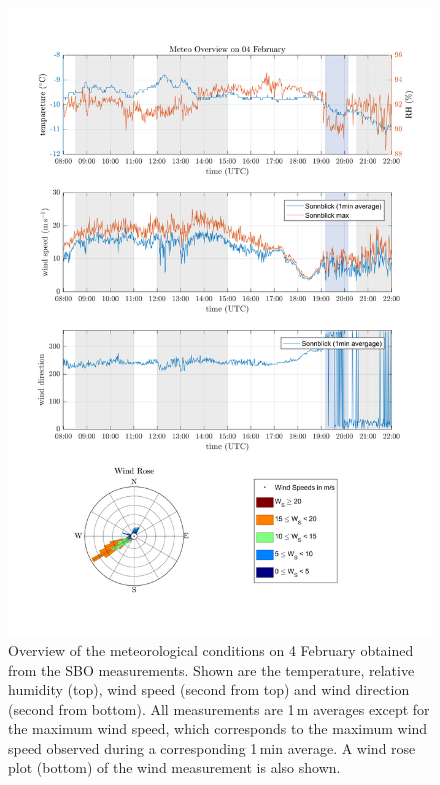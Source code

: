 \documentclass[draft,linenumbers]{agujournal}
\begin{document}
\begin{figure}[h]
 \centering
 	\includegraphics[width=14cm]{MeteoOvervire_0402.png}
 \caption{Overview of the meteorological conditions on 4 February obtained from the SBO measurements. Shown are the temperature, relative humidity (top), wind speed (second from top) and wind direction (second from bottom). All measurements are 1\,\si{m} averages except for the maximum wind speed, which corresponds to the maximum wind speed observed during a corresponding 1\,\si{min} average. A wind rose plot (bottom) of the wind measurement is also shown.}
 \label{fig:meteo0402}
\end{figure}
\end{document}
